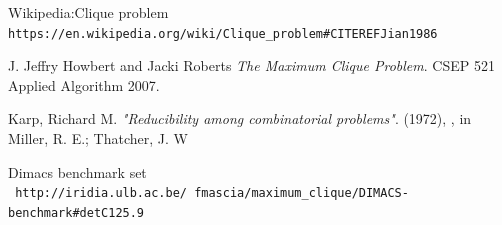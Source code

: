\documentclass{article}
\begin{document}
\begin{thebibliography}{}
Wikipedia:Clique problem
\\\texttt{https://en.wikipedia.org/wiki/Clique\_problem#CITEREFJian1986}


J. Jeffry Howbert and Jacki Roberts 
\textit{The Maximum Clique Problem}. 
CSEP 521 Applied Algorithm 2007.

Karp, Richard M.
\textit{"Reducibility among combinatorial problems"}. 
 (1972), , in Miller, R. E.; Thatcher, J. W
 
 

Dimacs benchmark set
\\\texttt{ http://iridia.ulb.ac.be/~fmascia/maximum\_clique/DIMACS-benchmark#detC125.9}




\end{thebibliography}
\end{document}

